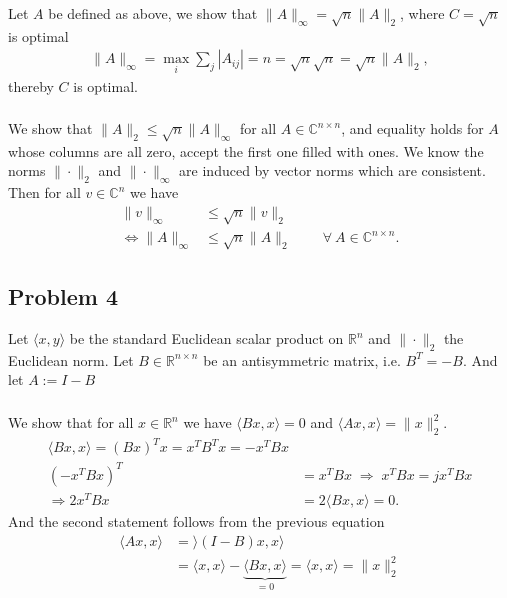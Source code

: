 \subsubsection{}
Let $A$ be defined as above, we show that $\|A\|_\infty = \sqrt{n} \|A\|_2$,
where $C = \sqrt{n} $ is optimal
\begin{align}
    \|A\|_\infty = \max_i \sum_j |A_{ij}| = n = \sqrt{n} \sqrt{n}  = \sqrt{n}
     \|A\|_2,
\end{align}
thereby $C$ is optimal.
\subsubsection{}
We show that $\|A\|_2 \le \sqrt{n} \|A\|_\infty$ for all $A \in
\mathbb{C}^{n\times n}$, and equality holds for $A$ whose columns are all
zero, accept the first one filled with ones. We know the norms
$\|\cdot\|_2$ and $\|\cdot\|_\infty$ are induced by vector norms which are
consistent. Then for all $v \in \mathbb{C}^{n}$ we have
\begin{align}
    \|v\|_\infty &\le\sqrt{n} \|v\|_2\\
    \Leftrightarrow \|A\|_\infty &\le \sqrt{n} \|A\|_2 \qquad\ \forall \ A
    \in \mathbb{C}^{n\times n}.
\end{align}
\subsection{Problem 4}
Let $\langle x, y \rangle$ be the standard Euclidean scalar product on
$\mathbb{R}^n$ and $\|\cdot\|_2$ the Euclidean norm. Let $B\in
\mathbb{R}^{n\times n}$ be an antisymmetric matrix, i.e. $B^T = -B$. And let
$A:= I - B$
\subsubsection{}
We show that for all $x \in \mathbb{R}^{n}$ we have $\langle Bx, x\rangle =0$
and $\langle Ax, x\rangle = \|x\|_2^2$.
\begin{align}
    \langle Bx, x\rangle = (Bx)^T x = x^T B^T x = -x^T B x\\
    (-x^TBx)^T &= x^TBx\; \Rightarrow\; x^T Bx = jx^TBx\\
    \Rightarrow 2x^T B x &= 2 \langle Bx, x\rangle = 0.
\end{align}
And the second statement follows from the previous equation
\begin{align}
    \langle Ax, x\rangle &= \rangle\left(I-B\right)x,x\rangle \\
                         &=\langle x, x\rangle - \underbrace{\langle Bx,
                         x\rangle}_{=0} = \langle x, x\rangle =
    \|x\|_2^2
\end{align}
